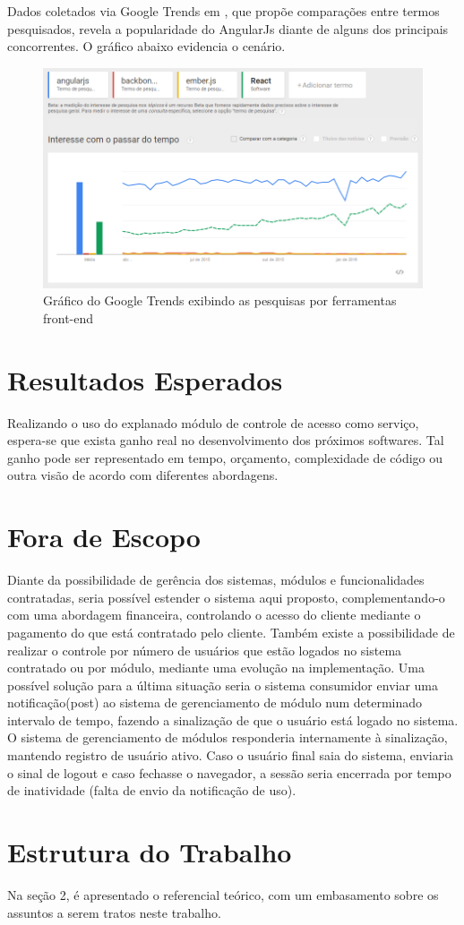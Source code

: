 Dados coletados via Google Trends em \citealp{GoogleTrends-Front-end-Frameworks}, que propõe comparações entre termos pesquisados, revela a popularidade do AngularJs diante de alguns dos principais concorrentes. O gráfico abaixo evidencia o cenário.


\begin{figure}
	\label{fig:graficoGoogleTrendsFerramentasFront}
	\includegraphics[width=1\textwidth]{img/grafico_ferramentas_front}
	\caption{Gráfico do Google Trends exibindo as pesquisas por ferramentas front-end}
\end{figure}


\section{Resultados Esperados}


Realizando o uso do explanado módulo de controle de acesso como serviço, espera-se que exista ganho real no desenvolvimento dos próximos softwares. Tal ganho pode ser representado em tempo, orçamento, complexidade de código ou outra visão de acordo com diferentes abordagens.

\section{Fora de Escopo}


Diante da possibilidade de gerência dos sistemas, módulos e funcionalidades contratadas, seria possível estender o sistema aqui proposto, complementando-o com uma abordagem financeira, controlando o acesso do cliente mediante o pagamento do que está contratado pelo cliente. Também existe a possibilidade de realizar o controle por número de usuários que estão logados no sistema contratado ou por módulo, mediante uma evolução na implementação. Uma possível solução para a última situação seria o sistema consumidor enviar uma notificação(post) ao sistema de gerenciamento de módulo num determinado intervalo de tempo, fazendo a sinalização de que o usuário está logado no sistema. O sistema de gerenciamento de módulos responderia internamente à sinalização, mantendo registro de usuário ativo. Caso o usuário final saia do sistema, enviaria o sinal de logout e caso fechasse o navegador, a sessão seria encerrada por tempo de inatividade (falta de envio da notificação de uso).


\section{Estrutura do Trabalho} %


Na seção 2, é apresentado o referencial teórico, com um embasamento sobre os assuntos a serem tratos neste trabalho.
